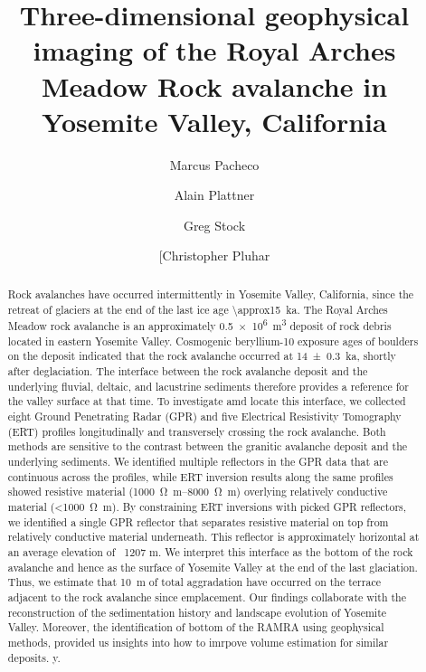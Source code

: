 \documentclass[5p]{elsarticle}
\begin{document}
	\begin{frontmatter}

\title{Three-dimensional geophysical imaging of the Royal Arches Meadow Rock avalanche in Yosemite Valley, California}

\author[Marcus]{Marcus Pacheco}
\address[Marcus]{Earth \& Environmental Sciences, California State University, Fresno}

\author[Alain]{Alain Plattner}
\address[Alain]{Geological Sciences, University of Alabama}

\author[Greg]{Greg Stock}
\address[Greg]{National Park Service, Yosemite National Park}

\author[Chris]{[Christopher Pluhar}
\address[Chris]{Earth \& Environmental Sciences, California State University, Fresno}



										\begin{abstract}
										

Rock avalanches have occurred intermittently in Yosemite Valley, California, since the retreat of glaciers at the end of the last ice age \SI{\approx15}{\kilo a}. The Royal Arches Meadow rock avalanche is an approximately \SI{0.5e6}{m^3} deposit of rock debris located in eastern Yosemite Valley. Cosmogenic beryllium-10 exposure ages of boulders on the deposit indicated that the rock avalanche occurred at \SI{14+-0.3}{\kilo a}, shortly after deglaciation. The interface between the rock avalanche deposit and the underlying fluvial, deltaic, and lacustrine sediments therefore provides a reference for the valley surface at that time. To investigate amd locate this interface, we collected eight Ground Penetrating Radar (GPR) and five Electrical Resistivity Tomography (ERT) profiles longitudinally and transversely crossing the rock avalanche. Both methods are sensitive to the contrast between the granitic avalanche deposit and the underlying sediments. We identified multiple reflectors in the GPR data that are continuous across the profiles, while ERT inversion results along the same profiles showed resistive material (\SIrange{1000}{8000}{\ohm.m}) overlying relatively conductive material (\SI{<1000}{\ohm.m}). By constraining ERT inversions with picked GPR reflectors, we identified a single GPR reflector that separates resistive material on top from relatively conductive material underneath. This reflector is approximately horizontal at an average elevation of ~1207 m. We interpret this interface as the bottom of the rock avalanche and hence as the surface of Yosemite Valley at the end of the last glaciation. Thus, we estimate that \SI{10}{m} of total aggradation have occurred on the terrace adjacent to the rock avalanche since emplacement. Our findings collaborate with the reconstruction of the sedimentation history and landscape evolution of Yosemite Valley. Moreover, the identification of bottom of the RAMRA using geophysical methods, provided us insights into how to imrpove volume estimation for similar deposits.     
y.


\end{abstract}
\end{frontmatter}
\end{document}
